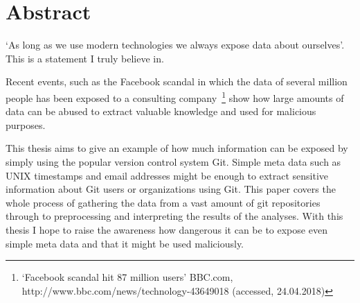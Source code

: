 \chapter*{Abstract}


`As long as we use modern technologies we always expose data about ourselves'. This is a statement I truly believe in.

Recent events, such as the Facebook scandal in which the data of several million people has been exposed to a consulting company~\footnote{`Facebook scandal hit 87 million users' BBC.com, http://www.bbc.com/news/technology-43649018 (accessed, 24.04.2018)} show how large amounts of data can be abused to extract valuable knowledge and used for malicious purposes.

This thesis aims to give an example of how much information can be exposed by simply using the popular version control system Git.
Simple meta data such as UNIX timestamps and email addresses might be enough to extract sensitive information about Git users or organizations using Git.
This paper covers the whole process of gathering the data from a vast amount of git repositories through to preprocessing and interpreting the results of the analyses.
With this thesis I hope to raise the awareness how dangerous it can be to expose even simple meta data and that it might be used maliciously.
